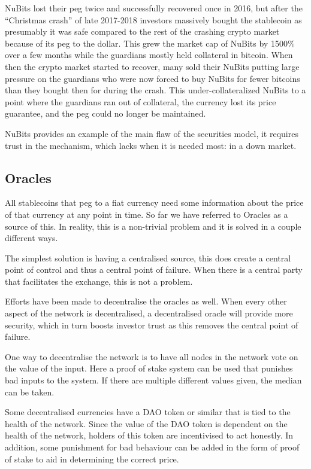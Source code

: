 \documentclass[english,]{IEEEtran}
\begin{document}
NuBits lost their peg twice and successfully recovered once in 2016, but
after the ``Christmas crash'' of late 2017-2018 investors massively
bought the stablecoin as presumably it was safe compared to the rest of
the crashing crypto market because of its peg to the dollar. This grew
the market cap of NuBits by 1500\% over a few months while the guardians
mostly held collateral in bitcoin. When then the crypto market started
to recover, many sold their NuBits putting large pressure on the
guardians who were now forced to buy NuBits for fewer bitcoins than they
bought then for during the crash. This under-collateralized NuBits to a
point where the guardians ran out of collateral, the currency lost its
price guarantee, and the peg could no longer be maintained.

NuBits provides an example of the main flaw of the securities model, it
requires trust in the mechanism, which lacks when it is needed most: in
a down market.

\subsection{Oracles}\label{oracles}

All stablecoins that peg to a fiat currency need some information about
the price of that currency at any point in time. So far we have referred
to Oracles as a source of this. In reality, this is a non-trivial
problem and it is solved in a couple different ways.

The simplest solution is having a centralised source, this does create a
central point of control and thus a central point of failure. When there
is a central party that facilitates the exchange, this is not a problem.

Efforts have been made to decentralise the oracles as well. When every
other aspect of the network is decentralised, a decentralised oracle
will provide more security, which in turn boosts investor trust as this
removes the central point of failure.

One way to decentralise the network is to have all nodes in the network
vote on the value of the input. Here a proof of stake system can be used
that punishes bad inputs to the system. If there are multiple different
values given, the median can be taken.

Some decentralised currencies have a DAO token or similar that is tied
to the health of the network. Since the value of the DAO token is
dependent on the health of the network, holders of this token are
incentivised to act honestly. In addition, some punishment for bad
behaviour can be added in the form of proof of stake to aid in
determining the correct price.
\end{document}
